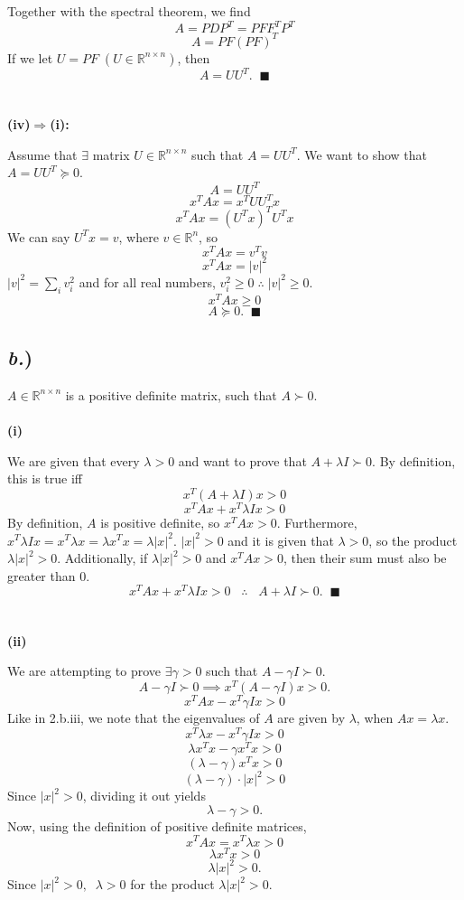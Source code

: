 \documentclass{report}
\begin{document}
Together with the spectral theorem, we find
$$ A = PDP^T = PFF^TP^T$$
$$ A = PF(PF)^T$$
If we let $U = PF\; (U \in \mathbb{R}^{n \times n})$, then 
$$ A = UU^T. \;\; \blacksquare$$
\-\\
\-\\
\textbf{(iv)}$\bm{\Rightarrow}$\textbf{(i):}

Assume that $\exists$ matrix $U \in \mathbb{R}^{n \times n}$ such that $A = UU^T$. We want to show that $ A = UU^T \succeq 0$. 
$$ A = UU^T $$
$$ x^TAx = x^TUU^Tx $$
$$ x^TAx = (U^Tx)^TU^Tx $$
We can say $U^Tx = v$, where $v \in \mathbb{R}^{n}$, so
$$ x^TAx = v^Tv $$
$$ x^TAx = |v|^2$$
$|v|^2 = \sum_{i}{v_i^2}$ and for all real numbers, $v_i^2 \geq 0 \; \therefore \; |v|^2 \geq 0.$
$$ x^TAx \geq 0$$
$$ A \succeq 0. \;\; \blacksquare$$

\subsection*{\textit{b.})}

$A \in \mathbb{R}^{n \times n}$ is a positive definite matrix, such that $A \succ 0.$\\
\-\\
\textbf{(i)}

We are given that every $\lambda > 0$ and want to prove that $A + \lambda I \succ 0$. By definition, this is true iff
$$ x^T(A+\lambda I)x > 0 $$
$$ x^TAx + x^T\lambda Ix > 0 $$
By definition, $A$ is positive definite, so $x^TAx > 0$. Furthermore, 
$ x^T\lambda Ix = x^T\lambda x = \lambda x^Tx = \lambda |x|^2$. $|x|^2 > 0$ and it is given that $\lambda > 0$, so the product $\lambda |x|^2 > 0$. Additionally, if $\lambda |x|^2 > 0$ and $x^TAx > 0$, then their sum must also be greater than 0. 
$$ x^TAx + x^T\lambda Ix > 0 \;\;\; \therefore \;\;\; A + \lambda I \succ 0. \;\; \blacksquare $$ 
\-\\
\-\\
\textbf{(ii)}

We are attempting to prove $\exists \gamma > 0$ such that $A - \gamma I \succ 0$.
$$ A - \gamma I \succ 0 \implies x^T(A-\gamma I)x > 0. $$
$$ x^TAx -x^T\gamma Ix > 0 $$
Like in 2.b.iii, we note that the eigenvalues of $A$ are given by $\lambda$, when $Ax = \lambda x$. 
$$ x^T\lambda x -x^T\gamma Ix > 0 $$
$$ \lambda x^Tx - \gamma x^Tx > 0 $$
$$ (\lambda - \gamma) x^Tx > 0 $$
$$ (\lambda - \gamma) \cdot |x|^2 > 0 $$
Since $|x|^2 > 0$, dividing it out yields
$$ \lambda - \gamma > 0. $$
Now, using the definition of positive definite matrices,
$$ x^TAx = x^T\lambda x > 0 $$
$$ \lambda x^Tx > 0 $$
$$ \lambda |x|^2 > 0 .$$
Since $|x|^2 > 0, \;\; \lambda > 0$ for the product $\lambda |x|^2 > 0 .$
\end{document}
